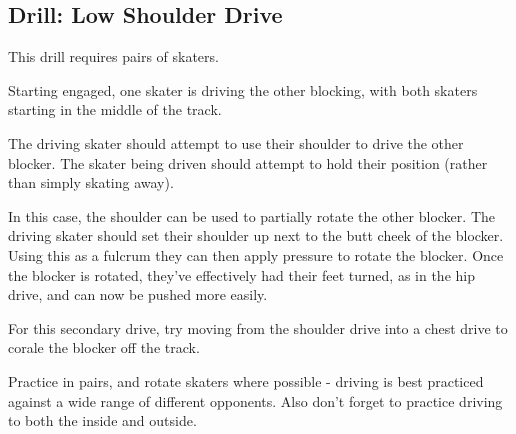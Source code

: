 \subsection*{Drill: Low Shoulder Drive}
\label{drill:drives/shoulder_low}

This drill requires pairs of skaters. 

Starting engaged, one skater is driving the other blocking, with both skaters starting in the middle of the track. 

The driving skater should attempt to use their shoulder to drive the other blocker.  
The skater being driven should attempt to hold their position (rather than simply skating away).


In this case, the shoulder can be used to partially rotate the other blocker. 
The driving skater should set their shoulder up next to the butt cheek of the blocker. Using this as a fulcrum they can then apply pressure to rotate the blocker. 
Once the blocker is rotated, they've effectively had their feet turned, as in the hip drive, and can now be pushed more easily. 

For this secondary drive, try moving from the shoulder drive into a chest drive to corale the blocker off the track. 


Practice in pairs, and rotate skaters where possible - driving is best practiced against a wide range of different opponents.
Also don't forget to practice driving to both the inside and outside.



